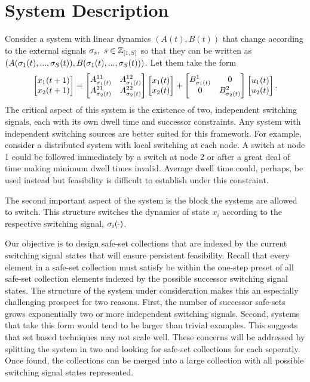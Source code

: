 \section{System Description}
Consider a system with linear dynamics $(A(t),B(t))$ that change according to the external signals $\ss_s,\ s\in\int\rii{1}{S}$ so that they can be written as $(A(\ss_1(t),...,\ss_S(t)),B(\ss_1(t),...,\ss_S(t)))$. Let them take the form
\begin{equation}
\begin{bmatrix}x_1(t+1)\\x_2(t+1)\end{bmatrix} = \begin{bmatrix}A_{\ss_1(t)}^{11} & A_{\ss_1(t)}^{12}\\A_{\ss_2(t)}^{21} & A_{\ss_2(t)}^{22}\end{bmatrix}\begin{bmatrix}x_1(t)\\x_2(t)\end{bmatrix}+\begin{bmatrix}B_{\ss_1(t)}^{1} & 0 \\0 & B_{\ss_2(t)}^{2}\end{bmatrix}\begin{bmatrix}u_1(t)\\u_2(t)\end{bmatrix}.
\end{equation}
The critical aspect of this system is the existence of two, independent switching signals, each with its own dwell time and successor constraints. Any system with independent switching sources are better suited for this framework. For example, consider a distributed system with local switching at each node. A switch at node 1 could be followed immediately by a switch at node 2 or after a great deal of time making minimum dwell times invalid. Average dwell time could, perhaps, be used instead but feasibility is difficult to establish under this constraint. 

The second important aspect of the system is the block the systems are allowed to switch. This structure switches the dynamics of state $x_i$ according to the respective switching signal, $\ss_i(\cdot)$. 

Our objective is to design safe-set collections that are indexed by the current switching signal states that will ensure persistent feasibility. Recall that every element in a safe-set collection must satisfy be within the one-step preset of all safe-set collection elements indexed by the possible successor switching signal states. The structure of the system under consideration makes this an especially challenging prospect for two reasons. First, the number of successor safe-sets grows exponentially two or more independent switching signals. Second, systems that take this form would tend to be larger than trivial examples. This suggests that set based techniques may not scale well. These concerns will be addressed by splitting the system in two and looking for safe-set collections for each seperatly. Once found, the collections can be merged into a large collection with all possible switching signal states represented.


